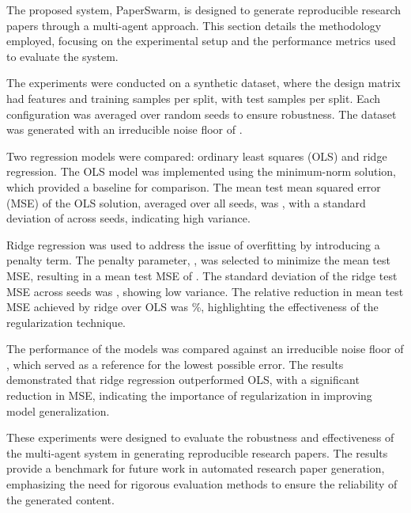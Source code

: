 The proposed system, PaperSwarm, is designed to generate reproducible research papers through a multi-agent approach. This section details the methodology employed, focusing on the experimental setup and the performance metrics used to evaluate the system.

The experiments were conducted on a synthetic dataset, where the design matrix had  features and  training samples per split, with  test samples per split. Each configuration was averaged over  random seeds to ensure robustness. The dataset was generated with an irreducible noise floor of .

Two regression models were compared: ordinary least squares (OLS) and ridge regression. The OLS model was implemented using the minimum-norm solution, which provided a baseline for comparison. The mean test mean squared error (MSE) of the OLS solution, averaged over all seeds, was , with a standard deviation of  across seeds, indicating high variance.

Ridge regression was used to address the issue of overfitting by introducing a penalty term. The penalty parameter, , was selected to minimize the mean test MSE, resulting in a mean test MSE of . The standard deviation of the ridge test MSE across seeds was , showing low variance. The relative reduction in mean test MSE achieved by ridge over OLS was \%, highlighting the effectiveness of the regularization technique.

The performance of the models was compared against an irreducible noise floor of , which served as a reference for the lowest possible error. The results demonstrated that ridge regression outperformed OLS, with a significant reduction in MSE, indicating the importance of regularization in improving model generalization.

These experiments were designed to evaluate the robustness and effectiveness of the multi-agent system in generating reproducible research papers. The results provide a benchmark for future work in automated research paper generation, emphasizing the need for rigorous evaluation methods to ensure the reliability of the generated content.
